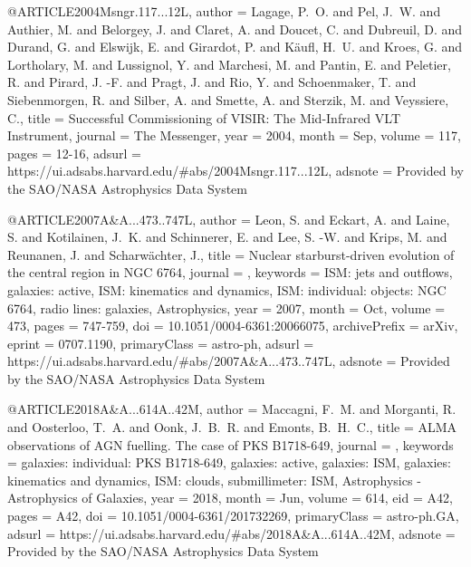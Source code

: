 \documentclass[longauth]{aa}
\begin{document}
{@ARTICLE{2004Msngr.117...12L,
       author = {{Lagage}, P.~O. and {Pel}, J.~W. and {Authier}, M. and {Belorgey}, J. and {Claret}, A. and {Doucet}, C. and {Dubreuil}, D. and {Durand}, G. and {Elswijk}, E. and {Girardot}, P. and {K{\"a}ufl}, H.~U. and {Kroes}, G. and {Lortholary}, M. and {Lussignol}, Y. and {Marchesi}, M. and {Pantin}, E. and {Peletier}, R. and {Pirard}, J. -F. and {Pragt}, J. and {Rio}, Y. and {Schoenmaker}, T. and {Siebenmorgen}, R. and {Silber}, A. and {Smette}, A. and {Sterzik}, M. and {Veyssiere}, C.},
        title = {Successful Commissioning of VISIR: The Mid-Infrared VLT Instrument},
      journal = {The Messenger},
         year = 2004,
        month = Sep,
       volume = {117},
        pages = {12-16},
       adsurl = {https://ui.adsabs.harvard.edu/#abs/2004Msngr.117...12L},
      adsnote = {Provided by the SAO/NASA Astrophysics Data System}
}

@ARTICLE{2007A&A...473..747L,
       author = {{Leon}, S. and {Eckart}, A. and {Laine}, S. and {Kotilainen}, J.~K. and {Schinnerer}, E. and {Lee}, S. -W. and {Krips}, M. and {Reunanen}, J. and {Scharw{\"a}chter}, J.},
        title = {Nuclear starburst-driven evolution of the central region in NGC 6764},
      journal = {\aap},
     keywords = {ISM: jets and outflows, galaxies: active, ISM: kinematics and dynamics, ISM: individual: objects: NGC 6764, radio lines: galaxies, Astrophysics},
         year = 2007,
        month = Oct,
       volume = {473},
        pages = {747-759},
          doi = {10.1051/0004-6361:20066075},
archivePrefix = {arXiv},
       eprint = {0707.1190},
 primaryClass = {astro-ph},
       adsurl = {https://ui.adsabs.harvard.edu/#abs/2007A&A...473..747L},
      adsnote = {Provided by the SAO/NASA Astrophysics Data System}
}

@ARTICLE{2018A&A...614A..42M,
       author = {{Maccagni}, F.~M. and {Morganti}, R. and {Oosterloo}, T.~A. and {Oonk}, J.~B.~R. and {Emonts}, B.~H.~C.},
        title = {ALMA observations of AGN fuelling. The case of PKS B1718-649},
      journal = {\aap},
     keywords = {galaxies: individual: PKS B1718-649, galaxies: active, galaxies: ISM, galaxies: kinematics and dynamics, ISM: clouds, submillimeter: ISM, Astrophysics - Astrophysics of Galaxies},
         year = 2018,
        month = Jun,
       volume = {614},
          eid = {A42},
        pages = {A42},
          doi = {10.1051/0004-6361/201732269},
 primaryClass = {astro-ph.GA},
       adsurl = {https://ui.adsabs.harvard.edu/#abs/2018A&A...614A..42M},
      adsnote = {Provided by the SAO/NASA Astrophysics Data System}
}

}
\end{document}

